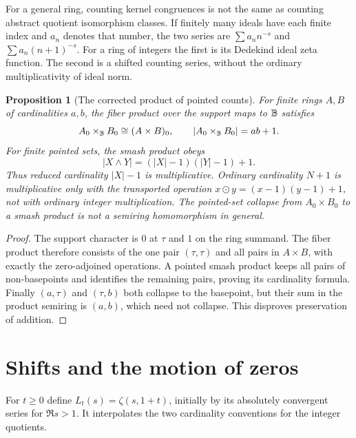 \documentclass[11pt]{article}
\newtheorem{proposition}[theorem]{Proposition}
\theoremstyle{definition}\newtheorem{definition}[theorem]{Definition}
\begin{document}
For a general ring, counting kernel congruences is not the same as counting abstract quotient isomorphism classes. If finitely many ideals have each finite index and $a_n$ denotes that number, the two series are $\sum a_n n^{-s}$ and $\sum a_n(n+1)^{-s}$. For a ring of integers the first is its Dedekind ideal zeta function. The second is a shifted counting series, without the ordinary multiplicativity of ideal norm.

\begin{proposition}[The corrected product of pointed counts]\label{prop:smash}
For finite rings $A,B$ of cardinalities $a,b$, the fiber product over the support maps to $\mathbb B$ satisfies
\[
 A_0\times_{\mathbb B}B_0\cong(A\times B)_0,
 \qquad |A_0\times_{\mathbb B}B_0|=ab+1.
\]
For finite pointed sets, the smash product obeys
\[
 |X\wedge Y|=(|X|-1)(|Y|-1)+1.
\]
Thus reduced cardinality $|X|-1$ is multiplicative. Ordinary cardinality $N+1$ is multiplicative only with the transported operation $x\odot y=(x-1)(y-1)+1$, not with ordinary integer multiplication. The pointed-set collapse from $A_0\times B_0$ to a smash product is not a semiring homomorphism in general.
\end{proposition}
\begin{proof}
The support character is $0$ at $\tau$ and $1$ on the ring summand. The fiber product therefore consists of the one pair $(\tau,\tau)$ and all pairs in $A\times B$, with exactly the zero-adjoined operations. A pointed smash product keeps all pairs of non-basepoints and identifies the remaining pairs, proving its cardinality formula. Finally $(a,\tau)$ and $(\tau,b)$ both collapse to the basepoint, but their sum in the product semiring is $(a,b)$, which need not collapse. This disproves preservation of addition.
\end{proof}

\section{Shifts and the motion of zeros}\label{sec:motion}
For $t\ge0$ define $L_t(s)=\zeta(s,1+t)$, initially by its absolutely convergent series for $\Re s>1$. It interpolates the two cardinality conventions for the integer quotients.
\end{document}
